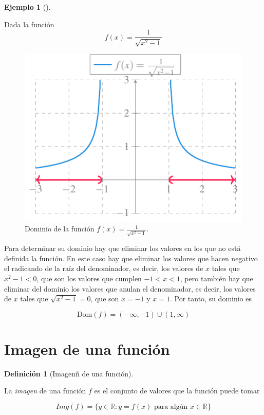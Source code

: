 \documentclass[
  a4paper,
]{scrreport}
\theoremstyle{definition}
\newtheorem{example}{Ejemplo}[chapter]
\theoremstyle{plain}
\theoremstyle{definition}
\newtheorem{definition}{Definición}[chapter]
\theoremstyle{definition}
\theoremstyle{plain}
\theoremstyle{plain}
\theoremstyle{remark}
\begin{document}
\begin{example}[]\protect\hypertarget{exm-dominio-funcion}{}\label{exm-dominio-funcion}

Dada la función \[f(x)=\frac{1}{\sqrt{x^2-1}}\]

\begin{figure}[H]

{\centering \includegraphics{./img/funciones/ejemplo-dominio.pdf}

}

\caption{Dominio de la función \(f(x)=\frac{1}{\sqrt{x^2-1}}\).}

\end{figure}%

Para determinar su dominio hay que eliminar los valores en los que no
está definida la función. En este caso hay que eliminar los valores que
hacen negativo el radicando de la raíz del denominador, es decir, los
valores de \(x\) tales que \(x^2-1<0\), que son los valores que cumplen
\(-1<x<1\), pero también hay que eliminar del dominio los valores que
anulan el denominador, es decir, los valores de \(x\) tales que
\(\sqrt{x^2-1}=0\), que son \(x=-1\) y \(x=1\). Por tanto, su dominio es

\[\mbox{Dom}(f)=(-\infty,-1)\cup(1,\infty)\]

\end{example}

\section{Imagen de una función}\label{imagen-de-una-funciuxf3n}

\begin{definition}[Imagenñ de una
función]\protect\hypertarget{def-imagen-funcion}{}\label{def-imagen-funcion}

La \emph{imagen} de una función \(f\) es el conjunto de valores que la
función puede tomar

\[Img(f)=\{y\in \mathbb{R}: y=f(x) \mbox{ para algún } x\in\mathbb{R}\}\]

\end{definition}
\end{document}
